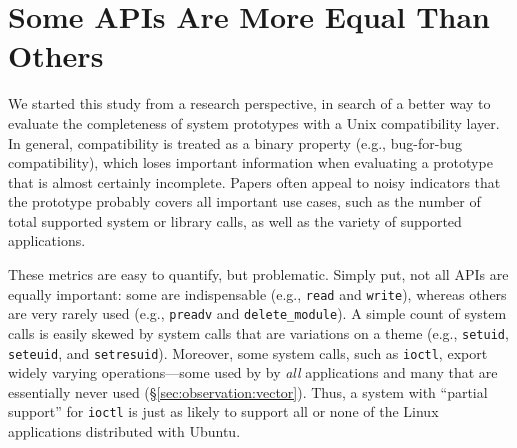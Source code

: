 \section{Some APIs Are More Equal Than Others}
\label{sec:syspop:measure}

We started this study from a research perspective, in search of a better way to evaluate
the completeness of system prototypes with a Unix compatibility layer.
In general, compatibility is treated as a binary property
(e.g., bug-for-bug compatibility), which loses 
important information when evaluating a prototype that is almost certainly incomplete.
Papers often appeal to noisy indicators that the prototype probably covers all important use cases,
such as the number of total supported system or library calls, as well as the variety
of supported applications.


These metrics are easy to quantify, but problematic.
Simply put, not all APIs are equally important: some are indispensable (e.g., {\tt read} and {\tt write}),
whereas others are very rarely used (e.g., {\tt preadv} and {\tt delete\_module}).
A simple count of system calls is easily skewed by 
system calls that are variations on a theme (e.g., {\tt setuid}, {\tt seteuid}, and {\tt setresuid}).
Moreover, some system calls, such as {\tt ioctl},
export widely varying operations---some used by 
by {\em all} applications and many that are essentially never used (\S\ref{sec:observation:vector}).
Thus, a system with ``partial support'' for {\tt ioctl}
is just as likely to support all or none of the Linux applications distributed with Ubuntu.





